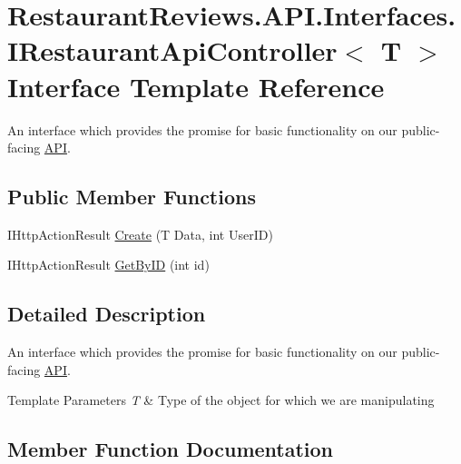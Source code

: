 \hypertarget{interface_restaurant_reviews_1_1_a_p_i_1_1_interfaces_1_1_i_restaurant_api_controller}{}\section{Restaurant\+Reviews.\+A\+P\+I.\+Interfaces.\+I\+Restaurant\+Api\+Controller$<$ T $>$ Interface Template Reference}
\label{interface_restaurant_reviews_1_1_a_p_i_1_1_interfaces_1_1_i_restaurant_api_controller}


An interface which provides the promise for basic functionality on our public-\/facing \hyperlink{namespace_restaurant_reviews_1_1_a_p_i}{A\+PI}.  


\subsection*{Public Member Functions}
\begin{DoxyCompactItemize}
\item 
I\+Http\+Action\+Result \hyperlink{interface_restaurant_reviews_1_1_a_p_i_1_1_interfaces_1_1_i_restaurant_api_controller_a983365b0017fb8c8677169ca66167c96}{Create} (T Data, int User\+ID)
\item 
I\+Http\+Action\+Result \hyperlink{interface_restaurant_reviews_1_1_a_p_i_1_1_interfaces_1_1_i_restaurant_api_controller_a339a10d66494d735885187e5375244bf}{Get\+By\+ID} (int id)
\end{DoxyCompactItemize}


\subsection{Detailed Description}
An interface which provides the promise for basic functionality on our public-\/facing \hyperlink{namespace_restaurant_reviews_1_1_a_p_i}{A\+PI}. 


\begin{DoxyTemplParams}{Template Parameters}
{\em T} & Type of the object for which we are manipulating\\
\hline
\end{DoxyTemplParams}


\subsection{Member Function Documentation}
